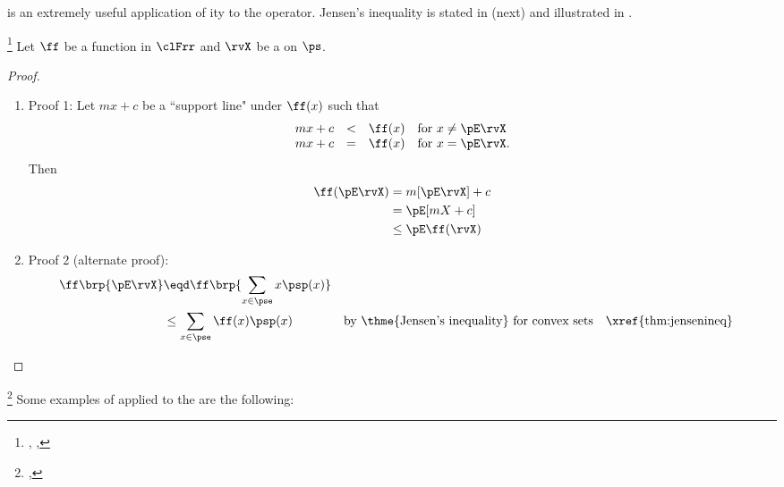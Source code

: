  is an extremely useful application of ity  to the
 operator.
Jensen's inequality is stated in  (next)
and illustrated in .
\begin{corollary}
\footnote{
  ,
  ,
  }
\label{cor:jensen}
Let $\ff$ be a function in $\clFrr$ and $\rvX$ be a  on $\ps$.
\end{corollary}
\begin{proof}
\begin{enumerate}
  \item Proof 1:
Let $mx+c$ be a ``support line" under $\ff(x)$  such that
\[
  \begin{array}{rcll}
    mx+c &<& \ff(x) & \mbox{for } x\ne \pE\rvX \\
    mx+c &=& \ff(x) & \mbox{for } x=\pE\rvX.
  \end{array}
\]
Then
\begin{align*}
  \ff(\pE\rvX)
    &=   m[\pE\rvX] + c
  \\&=   \pE[mX + c]
  \\&\le \pE\ff(\rvX)
\end{align*}

  \item Proof 2 (alternate proof):
    \begin{align*}
      \ff\brp{\pE\rvX}
        &\eqd \ff\brp{\sum_{x\in\pse} x \psp(x)}
      \\&\le \sum_{x\in\pse} \ff(x) \psp(x)
        && \text{by \thme{Jensen's inequality} for convex sets}
        && \text{\xref{thm:jensenineq}}
    \end{align*}
\end{enumerate}
\end{proof}

\begin{example}
\footnote{
  ,
  }
\label{ex:jensen}
Some examples of   applied to the 
are the following:
\end{example}

